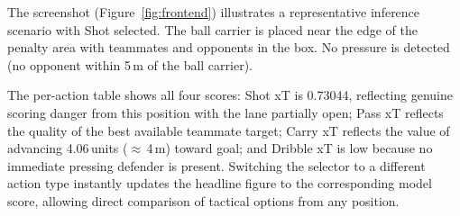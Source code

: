 The screenshot (Figure~\ref{fig:frontend}) illustrates a representative inference scenario with Shot selected. The ball carrier is placed near the edge of the penalty area with teammates and opponents in the box. No pressure is detected (no opponent within 5\,m of the ball carrier).

The per-action table shows all four scores: Shot xT is 0.73044, reflecting genuine scoring danger from this position with the lane partially open; Pass xT reflects the quality of the best available teammate target; Carry xT reflects the value of advancing 4.06\,units ($\approx$\,4\,m) toward goal; and Dribble xT is low because no immediate pressing defender is present. Switching the selector to a different action type instantly updates the headline figure to the corresponding model score, allowing direct comparison of tactical options from any position.
